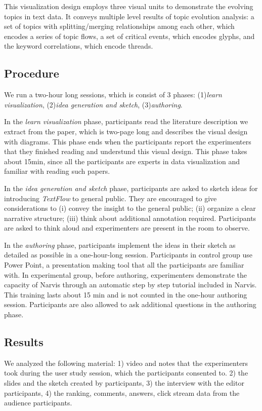 This visualization design employs three visual units to demonstrate the evolving topics in text data. It conveys multiple level results of topic evolution analysis: a set of topics
with splitting/merging relationships among each other, which encodes a series of topic flows, a set of critical events, which encodes glyphs, and the keyword correlations, which encode threads.  

\subsection{Procedure}
We run a two-hour long sessions, which is consist of 3 phases: (1)\textit{learn visualization}, (2)\textit{idea generation and sketch}, (3)\textit{authoring}.\par
In the \textit{learn visualization} phase, participants read the literature description we extract from the paper, which is two-page long and describes the visual design with diagrams. This phase ends when the participants report the experimenters that they finished reading and understund this visual design. 
This phase takes about 15min, since all the participants are experts in data visualization and familiar with reading such papers.

In the \textit{idea generation and sketch} phase, participants are asked to sketch ideas for introducing \textit{TextFlow} to general public. They are encouraged to give considerations to (i) convey the insight to the general public; (ii) organize a clear narrative structure; (iii) think about additional annotation required. Participants are asked to think aloud and experimenters are present in the room to observe. 

In the \textit{authoring} phase, participants implement the ideas in their sketch as detailed as possible in a one-hour-long session. Participants in control group use Power Point, a presentation making tool that all the participants are familiar with. In experimental group, before authoring, experimenters demonstrate the capacity of Narvis through an automatic step by step tutorial included in Narvis. This training lasts about 15 min and is not counted in the one-hour authoring session. Participants are also allowed to ask additional questions in the authoring phase.

\subsection{Results}
We analyzed the following material: 1) video and notes that the experimenters took during the user study session, which the participants consented to. 2) the slides and the sketch created by participants, 3) the interview with the editor participants, 4) the ranking, comments, answers, click stream data from the audience participants. 
